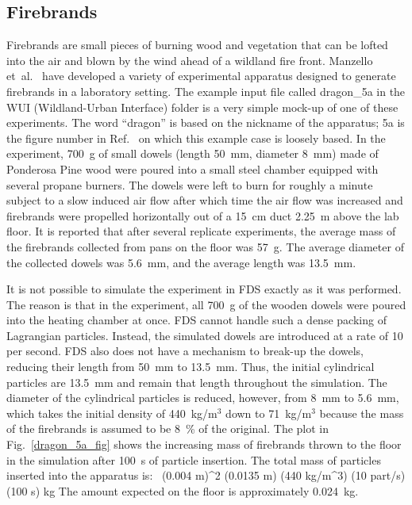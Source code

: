 \documentclass[11pt]{book}
\begin{document}
\subsection{Firebrands}
\label{info:firebrands}
\label{dragon_5a}

Firebrands are small pieces of burning wood and vegetation that can be lofted into the air and blown by the wind ahead of a wildland fire front. Manzello et~al.~\cite{Manzello:FSJ2008a} have developed a variety of experimental apparatus designed to generate firebrands in a laboratory setting. The example input file called {\ct dragon\_5a} in the {\ct WUI} (Wildland-Urban Interface) folder is a very simple mock-up of one of these experiments. The word ``dragon'' is based on the nickname of the apparatus; 5a is the figure number in Ref.~\cite{Manzello:FSJ2008a} on which this example case is loosely based. In the experiment, 700~g of small dowels (length 50~mm, diameter 8~mm) made of Ponderosa Pine wood were poured into a small steel chamber equipped with several propane burners. The dowels were left to burn for roughly a minute subject to a slow induced air flow after which time the air flow was increased and firebrands were propelled horizontally out of a 15~cm duct 2.25~m above the lab floor. It is reported that after several replicate experiments, the average mass of the firebrands collected from pans on the floor was 57~g. The average diameter of the collected dowels was 5.6~mm, and the average length was 13.5~mm.

It is not possible to simulate the experiment in FDS exactly as it was performed. The reason is that in the experiment, all 700~g of the wooden dowels were poured into the heating chamber at once. FDS cannot handle such a dense packing of Lagrangian particles. Instead, the simulated dowels are introduced at a rate of 10 per second. FDS also does not have a mechanism to break-up the dowels, reducing their length from 50~mm to 13.5~mm. Thus, the initial cylindrical particles are 13.5~mm and remain that length throughout the simulation. The diameter of the cylindrical particles is reduced, however, from 8~mm to 5.6~mm, which takes the initial density of 440~kg/m$^3$ down to 71~kg/m$^3$ because the mass of the firebrands is assumed to be 8~\% of the original. The plot in Fig.~\ref{dragon_5a_fig} shows the increasing mass of firebrands thrown to the floor in the simulation after 100~s of particle insertion. The total mass of particles inserted into the apparatus is:
\be \pi \, (0.004 \; {\rm m})^2 \times (0.0135 \; {\rm m}) \times (440 \; {\rm kg/m}^3) \times (10 \; {\rm part/s}) \times (100 \; {\rm s})  \; {\rm kg} \ee
The amount expected on the floor is approximately 0.024~kg.
\end{document}
